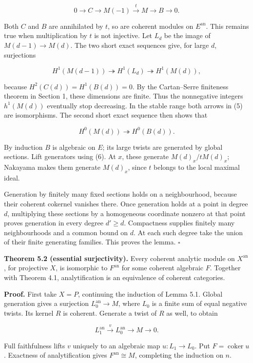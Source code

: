 \documentclass[11pt]{article}
\begin{document}
\[
0\to C\to M(-1)\xrightarrow{t}M\to B\to0.
\]

Both \(C\) and \(B\) are annihilated by \(t\), so are coherent modules
on \(E^{\mathrm{an}}\). This remains true when multiplication by \(t\)
is not injective. Let \(L_d\) be the image of \(M(d-1)\to M(d)\). The
two short exact sequences give, for large \(d\), surjections

\[
H^1(M(d-1))\twoheadrightarrow H^1(L_d)
\twoheadrightarrow H^1(M(d)),
\tag{5}
\]

because \(H^2(C(d))=H^1(B(d))=0\). By the Cartan--Serre finiteness
theorem in Section 1, these dimensions are finite. Thus the nonnegative
integers \(h^1(M(d))\) eventually stop decreasing. In the stable range
both arrows in (5) are isomorphisms. The second short exact sequence
then shows that

\[
H^0(M(d))\twoheadrightarrow H^0(B(d)).
\tag{6}
\]

By induction \(B\) is algebraic on \(E\); its large twists are generated
by global sections. Lift generators using (6). At \(x\), these generate
\(M(d)_x/tM(d)_x\); Nakayama makes them generate \(M(d)_x\), since \(t\)
belongs to the local maximal ideal.

Generation by finitely many fixed sections holds on a neighbourhood,
because their coherent cokernel vanishes there. Once generation holds at
a point in degree \(d\), multiplying these sections by a homogeneous
coordinate nonzero at that point proves generation in every degree
\(d'\geq d\). Compactness supplies finitely many neighbourhoods and a
common bound on \(d\). At each such degree take the union of their
finite generating families. This proves the lemma. \(\square\)

\textbf{Theorem 5.2 (essential surjectivity).} Every coherent analytic
module on \(X^{\mathrm{an}}\), for projective \(X\), is isomorphic to
\(F^{\mathrm{an}}\) for some coherent algebraic \(F\). Together with
Theorem 4.1, analytification is an equivalence of coherent categories.

\textbf{Proof.} First take \(X=P\), continuing the induction of Lemma
5.1. Global generation gives a surjection \(L_0^{\mathrm{an}}\to M\),
where \(L_0\) is a finite sum of equal negative twists. Its kernel \(R\)
is coherent. Generate a twist of \(R\) as well, to obtain

\[
L_1^{\mathrm{an}}\xrightarrow{v}L_0^{\mathrm{an}}\to M\to0.
\]

Full faithfulness lifts \(v\) uniquely to an algebraic map
\(u:L_1\to L_0\). Put \(F=\operatorname{coker}u\). Exactness of
analytification gives \(F^{\mathrm{an}}\cong M\), completing the
induction on \(n\).
\end{document}
